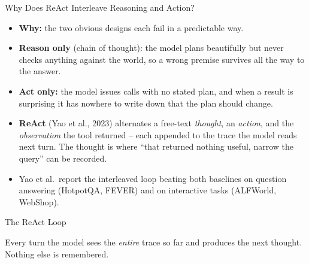 \begin{frame}{Why Does ReAct Interleave Reasoning and Action?}
\begin{itemize}
  \item \textbf{Why:} the two obvious designs each fail in a predictable way.
  \pause
  \item \textbf{Reason only} (chain of thought): the model plans beautifully but never checks anything against the world, so a wrong premise survives all the way to the answer.
  \pause
  \item \textbf{Act only:} the model issues calls with no stated plan, and when a result is surprising it has nowhere to write down that the plan should change.
  \pause
  \item \textbf{ReAct} (Yao et al., 2023) alternates a free-text \emph{thought}, an \emph{action}, and the \emph{observation} the tool returned -- each appended to the trace the model reads next turn. The thought is where ``that returned nothing useful, narrow the query'' can be recorded.
  \pause
  \item Yao et al.\ report the interleaved loop beating both baselines on question answering (HotpotQA, FEVER) and on interactive tasks (ALFWorld, WebShop).
\end{itemize}
\end{frame}

\begin{frame}{The ReAct Loop}
\centering
{}

\vspace{0.4em}
\footnotesize
Every turn the model sees the \emph{entire} trace so far and produces the next thought. Nothing else is remembered.
\end{frame}

